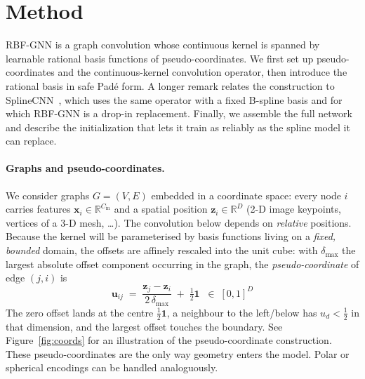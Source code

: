 \documentclass{article} %
\newcommand{\bx}{\mathbf{x}}
\newcommand{\bu}{\mathbf{u}}
\newcommand{\bz}{\mathbf{z}}
\newcommand{\R}{\mathbb{R}}
\newcommand{\Cin}{C_{\mathrm{in}}}
\newcommand{\ours}{RBF-GNN}
\begin{document}
\section{Method}
\label{sec:operator}

\ours{} is a graph convolution whose continuous kernel is spanned by learnable rational basis functions of pseudo-coordinates.
We first set up pseudo-coordinates and the continuous-kernel convolution operator, then introduce the rational basis in safe Pad\'e form.
A longer remark relates the construction to SplineCNN~\citep{fey2018splinecnn}, which uses the same operator with a fixed B-spline basis and for which \ours{} is a drop-in replacement.
Finally, we assemble the full network and describe the initialization that lets it train as reliably as the spline model it can replace.

\paragraph{Graphs and pseudo-coordinates.}
We consider graphs $G=(V,E)$ embedded in a coordinate space: every node $i$
carries features $\bx_i\in\R^{\Cin}$ and a spatial position $\bz_i\in\R^D$
(2-D image keypoints, vertices of a 3-D mesh, \dots). The convolution below
depends on \emph{relative} positions.
Because the kernel will be parameterised by basis functions living on a \emph{fixed, bounded}
domain, the offsets are affinely rescaled into the unit cube: with
$\delta_{\max}$ the largest absolute offset component occurring in the
graph, the \emph{pseudo-coordinate} of edge $(j,i)$ is
\begin{equation}
\bu_{ij} \;=\; \frac{\bz_j-\bz_i}{2\,\delta_{\max}} \;+\; \tfrac12\mathbf 1
\;\;\in\;[0,1]^D
\label{eq:pseudo}
\end{equation}
The zero offset lands at the centre $\tfrac12\mathbf 1$, a neighbour to the left/below has
$u_d<\tfrac12$ in that dimension, and the largest offset touches the
boundary.
See Figure~\ref{fig:coords} for an illustration of the pseudo-coordinate construction.
These pseudo-coordinates are the only way geometry enters the model.
Polar or spherical encodings can be handled analoguously.
\end{document}
